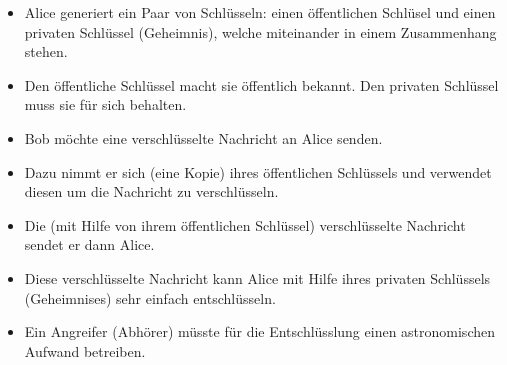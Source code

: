 %
%




\begin{frame}[fragile]
  \begin{itemize}
    \item Alice generiert ein Paar von Schlüsseln: einen öffentlichen Schlüsel und einen privaten Schlüssel (Geheimnis), welche miteinander in einem Zusammenhang stehen.
    \item Den öffentliche Schlüssel macht sie öffentlich bekannt. Den privaten Schlüssel muss sie für sich behalten.
  \end{itemize}
\end{frame}

\begin{frame}[fragile]
  \begin{itemize}
    \item Bob möchte eine verschlüsselte Nachricht an Alice senden.
    \item Dazu nimmt er sich (eine Kopie) ihres öffentlichen Schlüssels und verwendet diesen um die Nachricht zu verschlüsseln.
    \item Die (mit Hilfe von ihrem öffentlichen Schlüssel) verschlüsselte Nachricht sendet er dann Alice.
    \item Diese verschlüsselte Nachricht kann Alice mit Hilfe ihres privaten Schlüssels (Geheimnises) sehr einfach entschlüsseln. 
    \item Ein Angreifer (Abhörer) müsste für die Entschlüsslung einen astronomischen Aufwand betreiben.
  \end{itemize}
  \end{frame}

